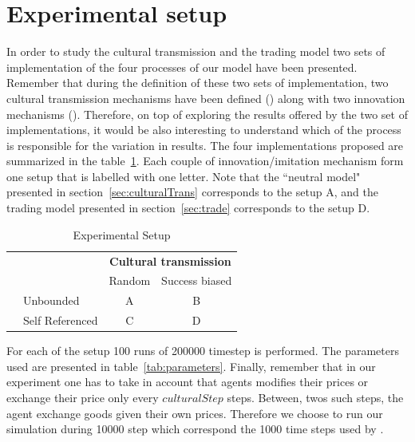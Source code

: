 \documentclass{wscpaperproc}
\begin{document}
\section{Experimental setup}
In order to study the cultural transmission and the trading model two sets of implementation of the four processes of our model have been presented. Remember that during the definition of these two sets of implementation, two cultural transmission mechanisms have been defined () along with two innovation mechanisms (). Therefore, on top of exploring the results offered by the two set of implementations, it would be also interesting to understand which of the process is responsible for the variation in results. The four implementations proposed are summarized in the table~\ref{tab:exp}. Each couple of innovation/imitation mechanism form one setup that is labelled with one letter. Note that the ``neutral model" presented in section~\ref{sec:culturalTrans} corresponds to the setup A, and the trading model presented in section~\ref{sec:trade} corresponds to the setup D.

\begin{table}[h]
	\centering
	\begin{tabular}{ll|cc}
				&	&\multicolumn{2}{c}{\textbf{Cultural transmission}} \\
		\multirow{2}[20]{*}{\rotatebox[origin=c]{90}{\textbf{Innovation}}}&  & Random & Success biased \\\hline  
		& \rule[-0.45cm]{0pt}{1cm} Unbounded 		&A & B \\
		& \rule[-0.45cm]{0pt}{1cm} Self Referenced	& C & D \\
	\end{tabular}
	\caption{Experimental Setup}
	\label{tab:exp}
\end{table}

For each of the setup 100 runs of 200000 timestep is performed. The parameters used are presented in table~\ref{tab:parameters}. Finally, remember that in our experiment one has to take in account that agents modifies their prices or exchange their price only every $culturalStep$ steps. Between, twos such steps, the agent exchange goods given their own prices. Therefore we choose to run our simulation during 10000 step which correspond the 1000 time steps used by .
\end{document}
